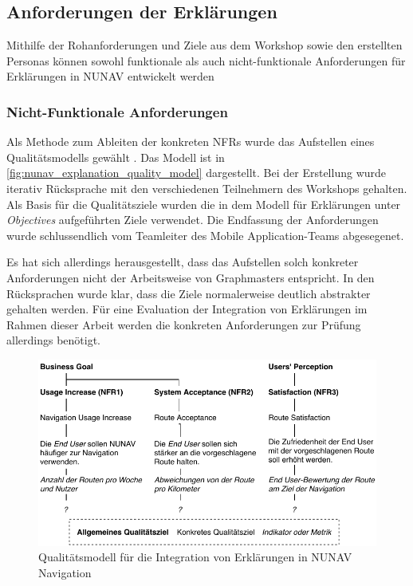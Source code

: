 \subsection{Anforderungen der Erklärungen}
\label{sec:explanation_requirements}

Mithilfe der Rohanforderungen und Ziele aus dem Workshop sowie den erstellten Personas können sowohl funktionale als auch nicht-funktionale Anforderungen für Erklärungen in NUNAV entwickelt werden

\subsubsection{Nicht-Funktionale Anforderungen}


Als Methode zum Ableiten der konkreten NFRs wurde das Aufstellen eines Qualitätsmodells gewählt \cite{schneider2012abenteuer}. Das Modell ist in \autoref{fig:nunav_explanation_quality_model} dargestellt. Bei der Erstellung wurde iterativ Rücksprache mit den verschiedenen Teilnehmern des Workshops gehalten. Als Basis für die Qualitätsziele wurden die in dem Modell für Erklärungen unter \textit{Objectives} aufgeführten Ziele verwendet. Die Endfassung der Anforderungen wurde schlussendlich vom Teamleiter des \glqq Mobile Application\grqq{}-Teams abgesegenet.

Es hat sich allerdings herausgestellt, dass das Aufstellen solch konkreter Anforderungen nicht der Arbeitsweise von Graphmasters entspricht. In den Rücksprachen wurde klar, dass die Ziele normalerweise deutlich abstrakter gehalten werden. Für eine Evaluation der Integration von Erklärungen im Rahmen dieser Arbeit werden die konkreten Anforderungen zur Prüfung allerdings benötigt.

\begin{figure}[htb!]
    \centering
    \includegraphics[width=\textwidth]{contents/06_model_evaluation/01_integration/res/quality_model.pdf}
    \caption{Qualitätsmodell für die Integration von Erklärungen in NUNAV Navigation}
    \label{fig:nunav_explanation_quality_model}
\end{figure}

